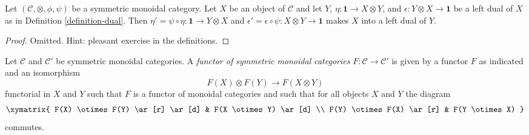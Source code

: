 \begin{lemma}
\label{lemma-dual-symmetric}
Let $(\mathcal{C}, \otimes, \phi, \psi)$ be a symmetric monoidal category.
Let $X$ be an object of $\mathcal{C}$ and let $Y$,
$\eta : \mathbf{1} \to X \otimes Y$, and
$\epsilon : Y \otimes X \to \mathbf{1}$
be a left dual of $X$ as in Definition \ref{definition-dual}.
Then $\eta' = \psi \circ \eta : \mathbf{1} \to Y \otimes X$
and $\epsilon' = \epsilon \circ \psi : X \otimes Y \to \mathbf{1}$
makes $X$ into a left dual of $Y$.
\end{lemma}

\begin{proof}
Omitted. Hint: pleasant exercise in the definitions.
\end{proof}

\begin{definition}
\label{definition-functor-symmetric-monoidal-categories}
Let $\mathcal{C}$ and $\mathcal{C}'$ be symmetric monoidal categories.
A {\it functor of symmetric monoidal categories}
$F : \mathcal{C} \to \mathcal{C}'$
is given by a functor $F$ as indicated and an isomorphism
$$
F(X) \otimes F(Y) \to F(X \otimes Y)
$$
functorial in $X$ and $Y$
such that $F$ is a functor of monoidal categories and such that
for all objects $X$ and $Y$ the diagram
$$
\xymatrix{
F(X) \otimes F(Y) \ar[r] \ar[d] &
F(X \otimes Y) \ar[d] \\
F(Y) \otimes F(X) \ar[r] &
F(Y \otimes X)
}
$$
commutes.
\end{definition}

